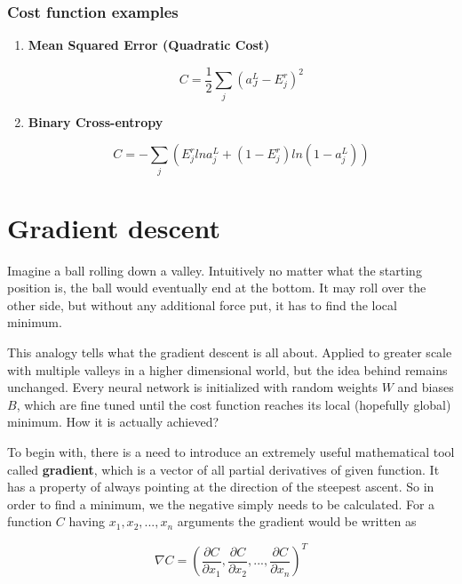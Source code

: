 \subsubsection*{Cost function examples}
\label{sub2:cost-function-examples}

\begin{enumerate}
    \item \textbf{Mean Squared Error (Quadratic Cost)}
    
    \begin{equation}
        C = \frac{1}{2}\sum_j (a^L_J - E^r_j)^2
    \end{equation}
    
    \item \textbf{Binary Cross-entropy}
    
    \begin{equation}
        C = -\sum_j\left(E_j^rlna_j^L + (1-E_j^r) ln(1 - a_j^L)\right)
    \end{equation}
    
\end{enumerate}

\section{Gradient descent}
\label{sec:gradient-descent}

Imagine a ball rolling down a valley. Intuitively no matter what the starting position is, the ball would eventually end at the bottom. It may roll over the other side, but without any additional force put, it has to find the local minimum. 

This analogy tells what the gradient descent is all about. Applied to greater scale with multiple valleys in a higher dimensional world, but the idea behind remains unchanged. Every neural network is initialized with random weights $W$ and biases $B$, which are fine tuned until the cost function reaches its local (hopefully global) minimum. How it is actually achieved?

To begin with, there is a need to introduce an extremely useful mathematical tool called \textbf{gradient}, which is a vector of all partial derivatives of given function. It has a property of always pointing at the direction of the steepest ascent. So in order to find a minimum, we the negative simply needs to be calculated. For a function $C$ having $x_1, x_2, ..., x_n$ arguments the gradient would be written as 

\begin{equation}
\nabla C = \left(\frac{\partial C}{\partial x_1}, \frac{\partial C}{\partial x_2}, ..., \frac{\partial C}{\partial x_n}\right)^T
\end{equation}

